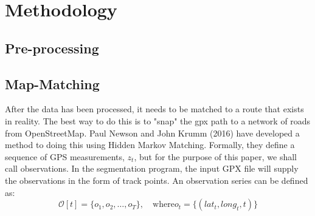 \documentclass[12pt,a4paper]{report}
\begin{document}
\tableofcontents
\newpage
\section{Methodology}

\subsection{Pre-processing}
\subsection{Map-Matching}
After the data has been processed, it needs to be matched to a route that exists in reality. The best way to do this is to "snap" the gpx path to a network of roads from OpenStreetMap.
Paul Newson and John Krumm (2016) have developed a method to doing this using Hidden Markov Matching.
Formally, they define a sequence of GPS measurements, $z_t$, but for the purpose of this paper, we shall call observations.
In the segmentation program, the input GPX file will supply the observations in the form of track points.
An observation series can be defined as:
\\
\[
	\mathcal{O}[t] = \{o_1,o_2,\dots,o_T\}, \quad \text{where} o_t = \{(lat_t,long_t,t)\}
\]
\end{document}

